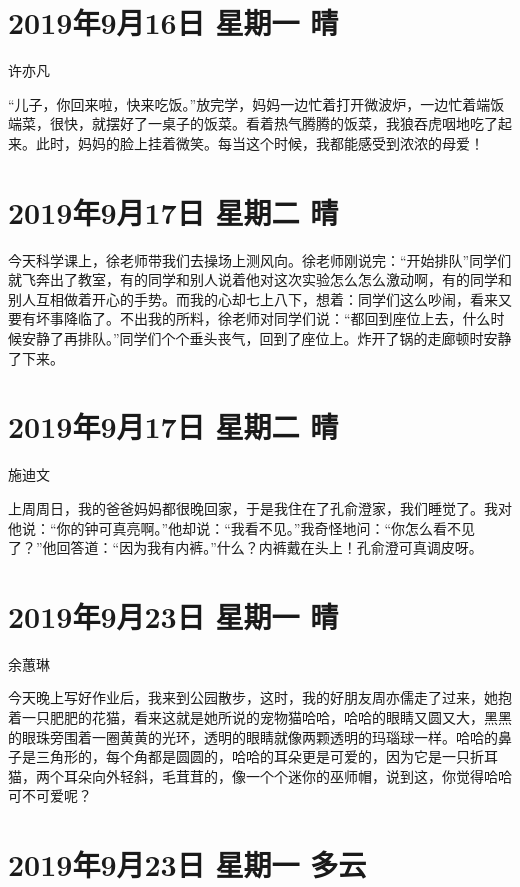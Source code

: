 \section{2019年9月16日 星期一 晴}

许亦凡

“儿子，你回来啦，快来吃饭。”放完学，妈妈一边忙着打开微波炉，一边忙着端饭端菜，很快，就摆好了一桌子的饭菜。看着热气腾腾的饭菜，我狼吞虎咽地吃了起来。此时，妈妈的脸上挂着微笑。每当这个时候，我都能感受到浓浓的母爱！

\section{2019年9月17日 星期二 晴}

今天科学课上，徐老师带我们去操场上测风向。徐老师刚说完：“开始排队”同学们就飞奔出了教室，有的同学和别人说着他对这次实验怎么怎么激动啊，有的同学和别人互相做着开心的手势。而我的心却七上八下，想着：同学们这么吵闹，看来又要有坏事降临了。不出我的所料，徐老师对同学们说：“都回到座位上去，什么时候安静了再排队。”同学们个个垂头丧气，回到了座位上。炸开了锅的走廊顿时安静了下来。

\section{2019年9月17日 星期二 晴}

施迪文

上周周日，我的爸爸妈妈都很晚回家，于是我住在了孔俞澄家，我们睡觉了。我对他说：“你的钟可真亮啊。”他却说：“我看不见。”我奇怪地问：“你怎么看不见了？”他回答道：“因为我有内裤。”什么？内裤戴在头上！孔俞澄可真调皮呀。

\section{2019年9月23日 星期一 晴}

余蕙琳

今天晚上写好作业后，我来到公园散步，这时，我的好朋友周亦儒走了过来，她抱着一只肥肥的花猫，看来这就是她所说的宠物猫哈哈，哈哈的眼睛又圆又大，黑黑的眼珠旁围着一圈黄黄的光环，透明的眼睛就像两颗透明的玛瑙球一样。哈哈的鼻子是三角形的，每个角都是圆圆的，哈哈的耳朵更是可爱的，因为它是一只折耳猫，两个耳朵向外轻斜，毛茸茸的，像一个个迷你的巫师帽，说到这，你觉得哈哈可不可爱呢？

\section{2019年9月23日 星期一 多云}

